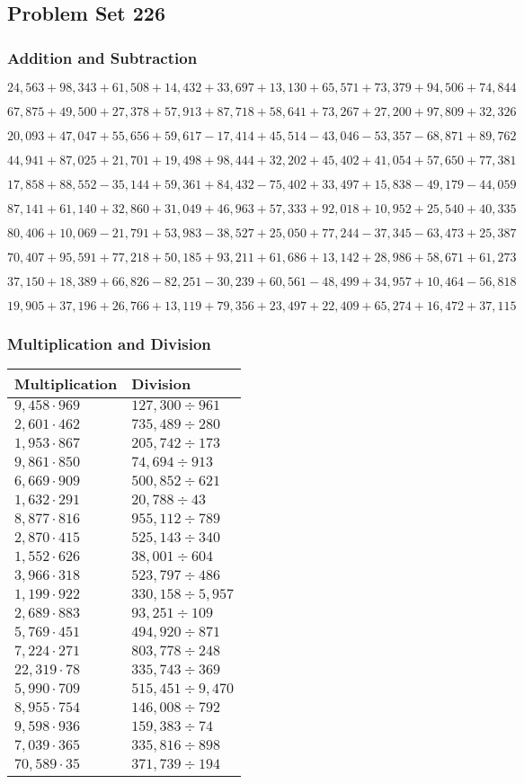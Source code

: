 \hypertarget{problem-set-226}{%
\subsection{Problem Set 226}\label{problem-set-226}}

\hypertarget{addition-and-subtraction}{%
\subsubsection{Addition and
Subtraction}\label{addition-and-subtraction}}

\(24,563+98,343+61,508+14,432+33,697+13,130+65,571+73,379+94,506+74,844\)

\(67,875+49,500+27,378+57,913+87,718+58,641+73,267+27,200+97,809+32,326\)

\(20,093+47,047+55,656+59,617-17,414+45,514-43,046-53,357-68,871+89,762\)

\(44,941+87,025+21,701+19,498+98,444+32,202+45,402+41,054+57,650+77,381\)

\(17,858+88,552-35,144+59,361+84,432-75,402+33,497+15,838-49,179-44,059\)

\(87,141+61,140+32,860+31,049+46,963+57,333+92,018+10,952+25,540+40,335\)

\(80,406+10,069-21,791+53,983-38,527+25,050+77,244-37,345-63,473+25,387\)

\(70,407+95,591+77,218+50,185+93,211+61,686+13,142+28,986+58,671+61,273\)

\(37,150+18,389+66,826-82,251-30,239+60,561-48,499+34,957+10,464-56,818\)

\(19,905+37,196+26,766+13,119+79,356+23,497+22,409+65,274+16,472+37,115\)

\hypertarget{multiplication-and-division}{%
\subsubsection{Multiplication and
Division}\label{multiplication-and-division}}

\begin{longtable}[]{@{}ll@{}}
\toprule
Multiplication & Division\tabularnewline
\midrule
\endhead
\(9,458\cdot969\) & \(127,300÷961\)\tabularnewline
\(2,601\cdot462\) & \(735,489÷280\)\tabularnewline
\(1,953\cdot867\) & \(205,742÷173\)\tabularnewline
\(9,861\cdot850\) & \(74,694÷913\)\tabularnewline
\(6,669\cdot909\) & \(500,852÷621\)\tabularnewline
\(1,632\cdot291\) & \(20,788÷43\)\tabularnewline
\(8,877\cdot816\) & \(955,112÷789\)\tabularnewline
\(2,870\cdot415\) & \(525,143÷340\)\tabularnewline
\(1,552\cdot626\) & \(38,001÷604\)\tabularnewline
\(3,966\cdot318\) & \(523,797÷486\)\tabularnewline
\(1,199\cdot922\) & \(330,158÷5,957\)\tabularnewline
\(2,689\cdot883\) & \(93,251÷109\)\tabularnewline
\(5,769\cdot451\) & \(494,920÷871\)\tabularnewline
\(7,224\cdot271\) & \(803,778÷248\)\tabularnewline
\(22,319\cdot78\) & \(335,743÷369\)\tabularnewline
\(5,990\cdot709\) & \(515,451÷9,470\)\tabularnewline
\(8,955\cdot754\) & \(146,008÷792\)\tabularnewline
\(9,598\cdot936\) & \(159,383÷74\)\tabularnewline
\(7,039\cdot365\) & \(335,816÷898\)\tabularnewline
\(70,589\cdot35\) & \(371,739÷194\)\tabularnewline
\bottomrule
\end{longtable}
